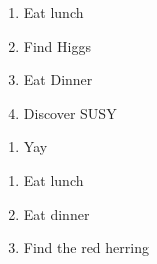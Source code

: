 

\begin{enumerate}
\item Eat lunch
\item Find Higgs
\item Eat Dinner
\item Discover SUSY
\end{enumerate}


\begin{enumerate}
\item Yay
\end{enumerate}



\begin{enumerate}
\item Eat lunch
\item Eat dinner
\item Find the red herring
\end{enumerate}



